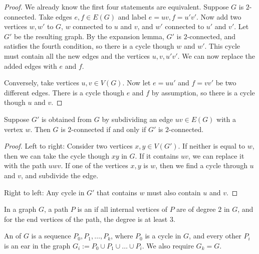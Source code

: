 \begin{proof}
  We already know the first four statements are equivalent.
  Suppose $G$ is $2$-connected.
  Take edges $e, f \in E(G)$ and label $e = uv, f = u'v'$.
  Now add two vertices $w, w'$ to $G$, $w$ connected to $u$ and $v$, and $w'$
  connected to $u'$ and $v'$.
  Let $G'$ be the resulting graph.
  By the expansion lemma, $G'$ is $2$-connected, and satisfies the fourth
  condition, so there is a cycle though $w$ and $w'$.
  This cycle must contain all the new edges and the vertices $u,v,u'v'$.
  We can now replace the added edges with $e$ and $f$.

  Conversely, take vertices $u,v \in V(G)$.
  Now let $e = uu'$ and $f = vv'$ be two different edges.
  There is a cycle though $e$ and $f$ by assumption, so there is a cycle though
  $u$ and $v$.
\end{proof}

\begin{proposition}
  Suppose $G'$ is obtained from $G$ by subdividing an edge $uv \in E(G)$ with a
  vertex $w$.
  Then $G$ is $2$-connected if and only if $G'$ is $2$-connected.
\end{proposition}

\begin{proof}
  Left to right:
  Consider two vertices $x, y \in V(G')$.
  If neither is equal to $w$, then we can take the cycle though $xy$
  in $G$.
  If it contains $uv$, we can replace it with the path $uwv$.
  If one of the vertices $x,y$ is $w$, then we find a cycle through $u$
  and $v$, and subdivide the edge.

  Right to left:
  Any cycle in $G'$ that contains $w$ must also contain $u$ and $v$.
\end{proof}


\begin{definition}
  In a graph $G$, a path $P$ is an  if all internal vertices
  of $P$ are of degree $2$ in $G$, and for the end vertices of the path, the
  degree is at least $3$.
\end{definition}

\begin{definition}
  An  of $G$ is a sequence $P_0, P_1, \ldots,
  P_k$, where $P_0$ is a cycle in $G$, and every other $P_i$ is an ear in the
  graph $G_i := P_0 \cup P_1 \cup \ldots \cup P_i$.
  We also require $G_k = G$.
\end{definition}

